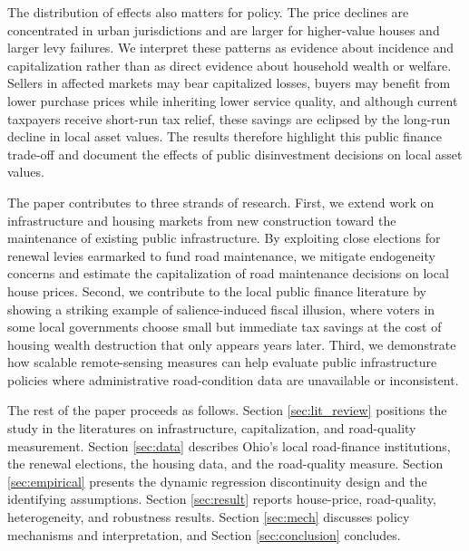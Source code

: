 The distribution of effects also matters for policy. The price declines are concentrated in urban jurisdictions and are larger for higher-value houses and larger levy failures. We interpret these patterns as evidence about incidence and capitalization rather than as direct evidence about household wealth or welfare. Sellers in affected markets may bear capitalized losses, buyers may benefit from lower purchase prices while inheriting lower service quality, and although current taxpayers receive short-run tax relief, these savings are eclipsed by the long-run decline in local asset values. The results therefore highlight this public finance trade-off and document the effects of public disinvestment decisions on local asset values.

The paper contributes to three strands of research. First, we extend work on infrastructure and housing markets from new construction toward the maintenance of existing public infrastructure. By exploiting close elections for renewal levies earmarked to fund road maintenance, we mitigate endogeneity concerns and estimate the capitalization of road maintenance decisions on local house prices. Second, we contribute to the local public finance literature by showing a striking example of salience-induced fiscal illusion, where voters in some local governments choose small but immediate tax savings at the cost of housing wealth destruction that only appears years later.
Third, we demonstrate how scalable remote-sensing measures can help evaluate public infrastructure policies where administrative road-condition data are unavailable or inconsistent. 

The rest of the paper proceeds as follows. Section \ref{sec:lit_review} positions the study in the literatures on infrastructure, capitalization, and road-quality measurement. Section \ref{sec:data} describes Ohio's local road-finance institutions, the renewal elections, the housing data, and the road-quality measure. Section \ref{sec:empirical} presents the dynamic regression discontinuity design and the identifying assumptions. Section \ref{sec:result} reports house-price, road-quality, heterogeneity, and robustness results. Section \ref{sec:mech} discusses policy mechanisms and interpretation, and Section \ref{sec:conclusion} concludes.
